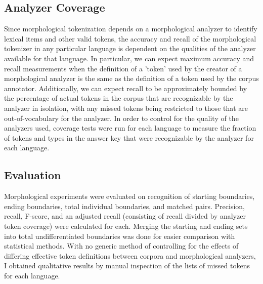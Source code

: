 \subsection{Analyzer Coverage}
Since morphological tokenization depends on a morphological analyzer to identify lexical items and other valid tokens, the accuracy and recall of the morphological tokenizer in any particular language is dependent on the qualities of the analyzer available for that language. In particular, we can expect maximum accuracy and recall measurements when the definition of a 'token' used by the creator of a morphological analyzer is the same as the definition of a token used by the corpus annotator. Additionally, we can expect recall to be approximately bounded by the percentage of actual tokens in the corpus that are recognizable by the analyzer in isolation, with any missed tokens being restricted to those that are out-of-vocabulary for the analyzer.
In order to control for the quality of the analyzers used, coverage tests were run for each language to measure the fraction of tokens and types in the answer key that were recognizable by the analyzer for each language.

\subsection{Evaluation}
Morphological experiments were evaluated on recognition of starting boundaries, ending boundaries, total individual boundaries, and matched pairs. Precision, recall, F-score, and an adjusted recall (consisting of recall divided by analyzer token coverage) were calculated for each. Merging the starting and ending sets into total undifferentiated boundaries was done for easier comparison with statistical methods.
With no generic method of controlling for the effects of differing effective token definitions between corpora and morphological analyzers, I obtained qualitative results by manual inspection of the lists of missed tokens for each language.

